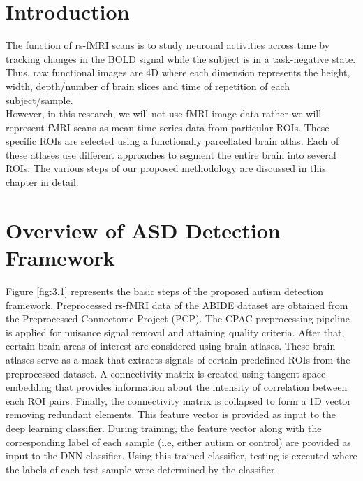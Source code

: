 \section{Introduction}
The function of rs-fMRI scans is to study neuronal activities across time by tracking changes
in the BOLD signal while the subject is in a task-negative state. Thus, raw functional images
are 4D where each dimension represents the height, width, depth/number of brain slices and
time of repetition of each subject/sample.\\

However, in this research, we will not use fMRI image data rather we will represent fMRI
scans as mean time-series data from particular ROIs. These specific ROIs are selected using a
functionally parcellated brain atlas. Each of these atlases use different approaches to segment
the entire brain into several ROIs. The various steps of our proposed methodology are
discussed in this chapter in detail.\\

\section{Overview of ASD Detection Framework}

Figure \ref{fig:3.1} represents the basic steps of the proposed autism detection framework. Preprocessed rs-fMRI data of the ABIDE dataset are obtained from the Preprocessed Connectome Project (\Gls{PCP}). The CPAC preprocessing pipeline is applied for nuisance signal removal and attaining quality criteria. After that, certain brain areas of interest are considered using brain atlases. These brain
atlases serve as a mask that extracts signals of certain predefined ROIs from the preprocessed
dataset. A connectivity matrix is created using tangent space embedding that provides
information about the intensity of correlation between each ROI pairs. Finally, the
connectivity matrix is collapsed to form a 1D vector removing redundant elements. This
feature vector is provided as input to the deep learning classifier. During training, the feature vector along with the corresponding label of each sample (i.e,
either autism or control) are provided as input to the DNN classifier. Using this trained
classifier, testing is executed where the labels of each test sample were determined by the
classifier.\\


